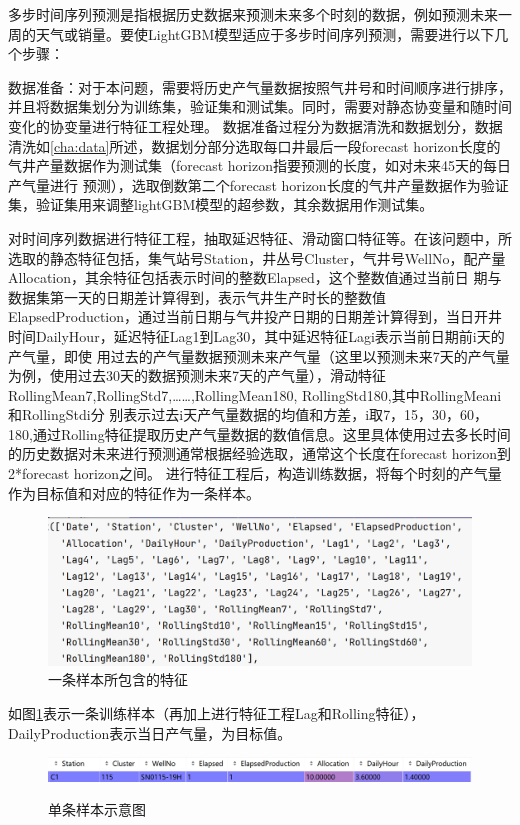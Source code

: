 多步时间序列预测是指根据历史数据来预测未来多个时刻的数据，例如预测未来一周的天气或销量。要使LightGBM模型适应于多步时间序列预测，需要进行以下几个步骤：

数据准备：对于本问题，需要将历史产气量数据按照气井号和时间顺序进行排序，并且将数据集划分为训练集，验证集和测试集。同时，需要对静态协变量和随时间变化的协变量进行特征工程处理。
数据准备过程分为数据清洗和数据划分，数据清洗如\ref{cha:data}所述，数据划分部分选取每口井最后一段forecast horizon长度的气井产量数据作为测试集（forecast horizon指要预测的长度，如对未来45天的每日产气量进行
预测），选取倒数第二个forecast horizon长度的气井产量数据作为验证集，验证集用来调整lightGBM模型的超参数，其余数据用作测试集。

对时间序列数据进行特征工程，抽取延迟特征、滑动窗口特征等。在该问题中，所选取的静态特征包括，集气站号Station，井丛号Cluster，气井号WellNo，配产量Allocation，其余特征包括表示时间的整数Elapsed，这个整数值通过当前日
期与数据集第一天的日期差计算得到，表示气井生产时长的整数值ElapsedProduction，通过当前日期与气井投产日期的日期差计算得到，当日开井时间DailyHour，延迟特征Lag1到Lag30，其中延迟特征Lagi表示当前日期前i天的产气量，即使
用过去的产气量数据预测未来产气量（这里以预测未来7天的产气量为例，使用过去30天的数据预测未来7天的产气量），滑动特征RollingMean7,RollingStd7,……,RollingMean180, RollingStd180,其中RollingMeani和RollingStdi分
别表示过去i天产气量数据的均值和方差，i取{7，15，30，60，180},通过Rolling特征提取历史产气量数据的数值信息。这里具体使用过去多长时间的历史数据对未来进行预测通常根据经验选取，通常这个长度在forecast horizon到2*forecast horizon之间。
进行特征工程后，构造训练数据，将每个时刻的产气量作为目标值和对应的特征作为一条样本。
\begin{figure}[H]
    \centering
    \caption{一条样本所包含的特征}
    \includegraphics{figure/asamplefeature.png}
\end{figure}
如图\ref{fig:singlesample}表示一条训练样本（再加上进行特征工程Lag和Rolling特征），DailyProduction表示当日产气量，为目标值。
\begin{figure}[H]
    \centering
    \caption{单条样本示意图}
    \includegraphics{figure/singlesample.png}
    \label{fig:singlesample}
\end{figure}
